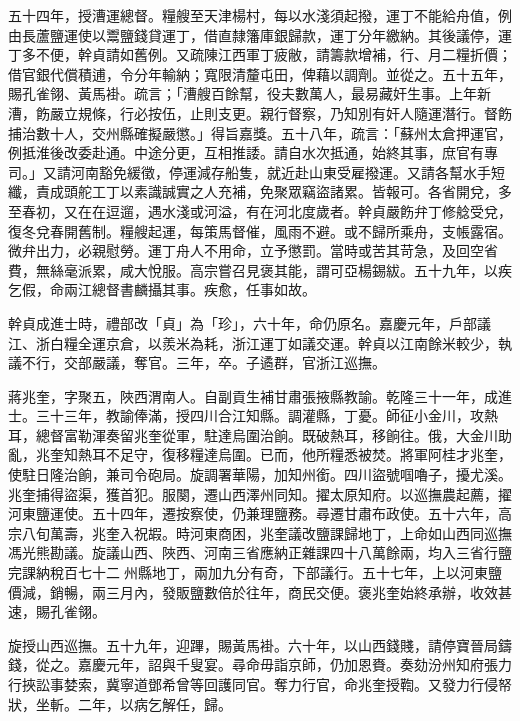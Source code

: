 \begin{pinyinscope}
五十四年，授漕運總督。糧艘至天津楊村，每以水淺須起撥，運丁不能給舟值，例由長蘆鹽運使以鬻鹽錢貸運丁，借直隸籓庫銀歸款，運丁分年繳納。其後議停，運丁多不便，幹貞請如舊例。又疏陳江西軍丁疲敝，請籌款增補，行、月二糧折價；借官銀代償積逋，令分年輸納；寬限清釐屯田，俾藉以調劑。並從之。五十五年，賜孔雀翎、黃馬褂。疏言；「漕艘百餘幫，役夫數萬人，最易藏奸生事。上年新漕，飭嚴立規條，行必按伍，止則支更。親行督察，乃知別有奸人隨運潛行。督飭捕治數十人，交州縣確擬嚴懲。」得旨嘉獎。五十八年，疏言：「蘇州太倉押運官，例抵淮後改委赴通。中途分更，互相推諉。請自水次抵通，始終其事，庶官有專司。」又請河南豁免緩徵，停運減存船隻，就近赴山東受雇撥運。又請各幫水手短纖，責成頭舵工丁以素識誠實之人充補，免聚眾竊盜諸累。皆報可。各省開兌，多至春初，又在在逗遛，遇水淺或河溢，有在河北度歲者。幹貞嚴飭弁丁修艌受兌，復冬兌春開舊制。糧艘起運，每策馬督催，風雨不避。或不歸所乘舟，支帳露宿。微弁出力，必親慰勞。運丁舟人不用命，立予懲罰。當時或苦其苛急，及回空省費，無絲毫派累，咸大悅服。高宗嘗召見褒其能，謂可亞楊錫紱。五十九年，以疾乞假，命兩江總督書麟攝其事。疾愈，任事如故。

幹貞成進士時，禮部改「貞」為「珍」，六十年，命仍原名。嘉慶元年，戶部議江、浙白糧全運京倉，以羨米為耗，浙江運丁如議交運。幹貞以江南餘米較少，執議不行，交部嚴議，奪官。三年，卒。子遹群，官浙江巡撫。

蔣兆奎，字聚五，陜西渭南人。自副貢生補甘肅張掖縣教諭。乾隆三十一年，成進士。三十三年，教諭俸滿，授四川合江知縣。調灌縣，丁憂。師征小金川，攻熱耳，總督富勒渾奏留兆奎從軍，駐達烏圍治餉。既破熱耳，移餉往。俄，大金川助亂，兆奎知熱耳不足守，復移糧達烏圍。已而，他所糧悉被焚。將軍阿桂才兆奎，使駐日隆治餉，兼司令砲局。旋調署華陽，加知州銜。四川盜號啯嚕子，擾尤溪。兆奎捕得盜渠，獲首犯。服闋，遷山西澤州同知。擢太原知府。以巡撫農起薦，擢河東鹽運使。五十四年，遷按察使，仍兼理鹽務。尋遷甘肅布政使。五十六年，高宗八旬萬壽，兆奎入祝嘏。時河東商困，兆奎議改鹽課歸地丁，上命如山西同巡撫馮光熊勘議。旋議山西、陜西、河南三省應納正雜課四十八萬餘兩，均入三省行鹽完課納稅百七十二州縣地丁，兩加九分有奇，下部議行。五十七年，上以河東鹽價減，銷暢，兩三月內，發販鹽數倍於往年，商民交便。褒兆奎始終承辦，收效甚速，賜孔雀翎。

旋授山西巡撫。五十九年，迎蹕，賜黃馬褂。六十年，以山西錢賤，請停寶晉局鑄錢，從之。嘉慶元年，詔與千叟宴。尋命毋詣京師，仍加恩賚。奏劾汾州知府張力行挾訟事婪索，冀寧道鄧希曾等回護同官。奪力行官，命兆奎授鞫。又發力行侵帑狀，坐斬。二年，以病乞解任，歸。


\end{pinyinscope}

